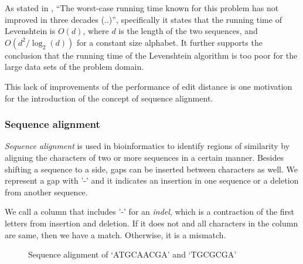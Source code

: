 As stated in \cite[pp.~1-2]{andoni}, ``The worst-case running time known for
this problem has not improved in three decades (..)'', specifically it states
that the running time of Levenshtein is $O(d)$, where $d$ is the length of the
two sequences, and $O(d^2/\log_2(d))$ for a constant size alphabet. It further
supports the conclusion that the running time of the Levenshtein algorithm is
too poor for the large data sets of the problem domain.

This lack of improvements of the performance of edit distance is one motivation
for the introduction of the concept of sequence alignment.



\subsubsection{Sequence alignment}

\emph{Sequence alignment} is used in bioinformatics to identify regions of
similarity by aligning the characters of two or more sequences in a certain
manner. Besides shifting a sequence to a side, gaps can be inserted between
characters as well. We represent a gap with '-' and it indicates an insertion
in one sequence or a deletion from another sequence.~\cite[pp.~135-136]{dong}

We call a column that includes '-' for an \emph{indel}, which is a contraction
of the first letters from insertion and deletion. If it does not and all
characters in the column are same, then we have a match. Otherwise, it is a
mismatch.

\begin{figure}[H]
\centering
{}
\caption{Sequence alignment of `ATGCAACGA' and `TGCGCGA'}
\label{fig:seqAlignment}
\end{figure}

